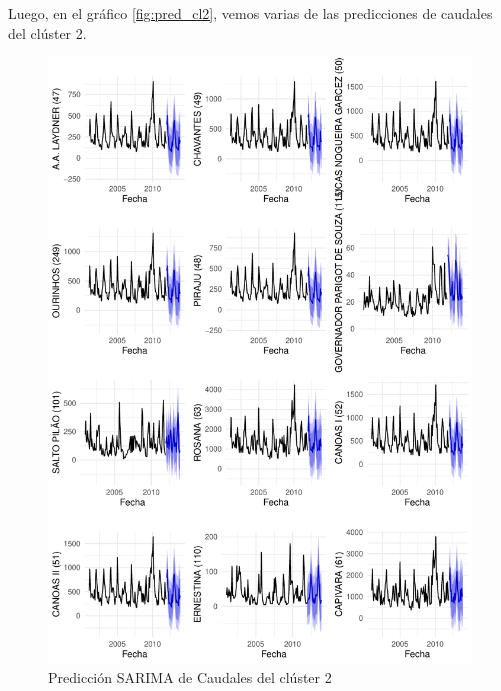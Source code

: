 \documentclass[12pt,oneside]{book}\usepackage[]{graphicx}\usepackage[]{color}
\makeatletter
\def\maxwidth{ %
  \ifdim\Gin@nat@width>\linewidth
    \linewidth
  \else
    \Gin@nat@width
  \fi
}
\newenvironment{knitrout}{}{} %
\theoremstyle{definition} %
\makeatother
\begin{document}
\begin{knitrout}
\end{knitrout}


Luego, en el gráfico \ref{fig:pred_cl2}, vemos varias de las predicciones de caudales del clúster 2.

\begin{knitrout}
\color{fgcolor}\begin{figure}[h]

{\centering \includegraphics[width=\maxwidth,height=0.85\textheight]{figure/unnamed-chunk-82-1} 

}

\caption{\label{fig:pred_cl2} Predicción SARIMA de Caudales del clúster 2}\label{fig:unnamed-chunk-82}
\end{figure}


\end{knitrout}
\end{document}
